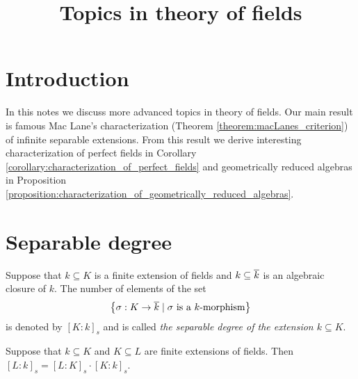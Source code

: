 



\title{Topics in theory of fields}
\date{}
\maketitle

\section{Introduction}
\noindent
In this notes we discuss more advanced topics in theory of fields. Our main result is famous Mac Lane's characterization (Theorem \ref{theorem:macLanes_criterion}) of infinite separable extensions. From this result we derive interesting characterization of perfect fields in Corollary \ref{corollary:characterization_of_perfect_fields} and geometrically reduced algebras in Proposition \ref{proposition:characterization_of_geometrically_reduced_algebras}.

\section{Separable degree}

\begin{definition}
Suppose that $k\subseteq K$ is a finite extension of fields and $k\subseteq \overline{k}$ is an algebraic closure of $k$. The number of elements of the set
$$\big\{\sigma:K\rightarrow \overline{k}\mid \text{$\sigma$ is a $k$-morphism}\big\}$$
is denoted by $[K:k]_s$ and is called \textit{the separable degree of the extension $k\subseteq K$}. 
\end{definition}

\begin{fact}\label{fact:separable_degree_is_multiplicative_for_tower}
Suppose that $k\subseteq K$ and $K\subseteq L$ are finite extensions of fields. Then $[L:k]_s=[L:K]_s\cdot [K:k]_s$.
\end{fact}

